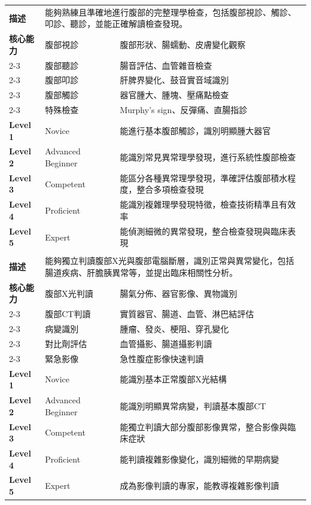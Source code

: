 \documentclass[12pt,a4paper]{article}
\begin{document}
\begin{longtable}{|p{1.2cm}|p{3.8cm}|p{8.5cm}|}
\rowcolor{gi_green!10}
\multicolumn{3}{|c|}{\textbf{EPA 2: 腹部理學檢查}} \\
\hline
\textbf{描述} & \multicolumn{2}{|p{12.5cm}|}{能夠熟練且準確地進行腹部的完整理學檢查，包括腹部視診、觸診、叩診、聽診，並能正確解讀檢查發現。} \\
\hline
\textbf{核心能力} & 腹部視診 & 腹部形狀、腸蠕動、皮膚變化觀察 \\
\cline{2-3}
& 腹部聽診 & 腸音評估、血管雜音檢查 \\
\cline{2-3}
& 腹部叩診 & 肝脾界變化、鼓音實音域識別 \\
\cline{2-3}
& 腹部觸診 & 器官腫大、腫塊、壓痛點檢查 \\
\cline{2-3}
& 特殊檢查 & Murphy's sign、反彈痛、直腸指診 \\
\hline
\textbf{Level 1} & Novice & 能進行基本腹部觸診，識別明顯腫大器官 \\
\hline
\textbf{Level 2} & Advanced Beginner & 能識別常見異常理學發現，進行系統性腹部檢查 \\
\hline
\textbf{Level 3} & Competent & 能區分各種異常理學發現，準確評估腹部積水程度，整合多項檢查發現 \\
\hline
\textbf{Level 4} & Proficient & 能識別複雜理學發現特徵，檢查技術精準且有效率 \\
\hline
\textbf{Level 5} & Expert & 能偵測細微的異常發現，整合檢查發現與臨床表現 \\
\hline

\rowcolor{gi_green!10}
\multicolumn{3}{|c|}{\textbf{EPA 3: 腹部影像判讀與分析}} \\
\hline
\textbf{描述} & \multicolumn{2}{|p{12.5cm}|}{能夠獨立判讀腹部X光與腹部電腦斷層，識別正常與異常變化，包括腸道疾病、肝膽胰異常等，並提出臨床相關性分析。} \\
\hline
\textbf{核心能力} & 腹部X光判讀 & 腸氣分佈、器官影像、異物識別 \\
\cline{2-3}
& 腹部CT判讀 & 實質器官、腸道、血管、淋巴結評估 \\
\cline{2-3}
& 病變識別 & 腫瘤、發炎、梗阻、穿孔變化 \\
\cline{2-3}
& 對比劑評估 & 血管攝影、腸道攝影判讀 \\
\cline{2-3}
& 緊急影像 & 急性腹症影像快速判讀 \\
\hline
\textbf{Level 1} & Novice & 能識別基本正常腹部X光結構 \\
\hline
\textbf{Level 2} & Advanced Beginner & 能識別明顯異常病變，判讀基本腹部CT \\
\hline
\textbf{Level 3} & Competent & 能獨立判讀大部分腹部影像異常，整合影像與臨床症狀 \\
\hline
\textbf{Level 4} & Proficient & 能判讀複雜影像變化，識別細微的早期病變 \\
\hline
\textbf{Level 5} & Expert & 成為影像判讀的專家，能教導複雜影像判讀 \\
\hline


\end{longtable}
\end{document}
